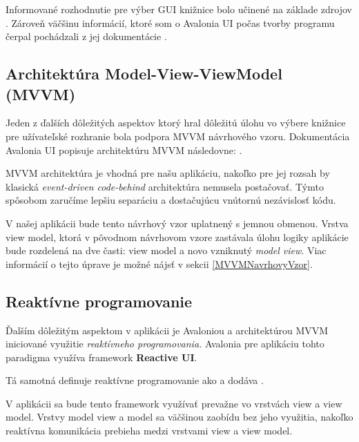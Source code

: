 Informované rozhodnutie pre výber GUI knižnice bolo učinené na základe zdrojov \cite{WpfGuide,WhatIsMAUI,AvaloniaMauiComparison}. Zároveň väčšinu informácií, ktoré som o Avalonia UI počas tvorby programu čerpal pochádzali z jej dokumentácie \cite{AvaloniaDokumentacia}.

\subsection{Architektúra Model-View-ViewModel (MVVM)}\label{ArchitekturaMVVM}

Jeden z ďalších dôležitých aspektov ktorý hral dôležitú úlohu vo výbere knižnice pre užívateľské rozhranie bola podpora MVVM návrhového vzoru. Dokumentácia Avalonia UI popisuje architektúru MVVM následovne: \cite{MVVMDefByAvalonia}.

MVVM architektúra je vhodná pre našu aplikáciu, nakoľko pre jej rozsah by klasická \textit{event-driven code-behind} architektúra nemusela postačovať. Týmto spôsobom zaručíme lepšiu separáciu a dostačujúcu vnútornú nezávislosť kódu.    

V našej aplikácii bude tento návrhový vzor uplatnený s jemnou obmenou. Vrstva view model, ktorá v pôvodnom návrhovom vzore zastávala úlohu logiky aplikácie bude rozdelená na dve časti: view model a novo vzniknutý \textit{model view}. Viac informácií o tejto úprave je možné nájsť v sekcii \ref{MVVMNavrhovyVzor}. 

\subsection{Reaktívne programovanie}

Ďalším dôležitým aspektom v aplikácii je Avaloniou a architektúrou MVVM iniciované využitie \textit{reaktívneho programovania.} Avalonia pre aplikáciu tohto paradigma využíva framework \textbf{Reactive UI}. 

Tá samotná definuje reaktívne programovanie ako  a dodáva \cite{ReactiveProgrammingByReactiveUI}.

V aplikácii sa bude tento framework využívať prevažne vo vrstvách view a view model. Vrstvy model view a model sa väčšinou zaobídu bez jeho využitia, nakoľko reaktívna komunikácia prebieha medzi vrstvami view a view model.   